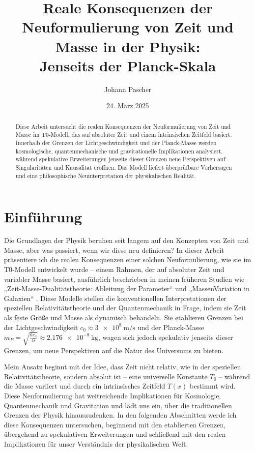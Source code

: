 \documentclass[a4paper,12pt]{article}
\title{Reale Konsequenzen der Neuformulierung von Zeit und Masse in der Physik: \\Jenseits der Planck-Skala}
\author{Johann Pascher}
\date{24. März 2025}
\newcommand{\Tfield}{T(x)}
\begin{document}
	
	\maketitle
	
	\begin{abstract}
		Diese Arbeit untersucht die realen Konsequenzen der Neuformulierung von Zeit und Masse im T0-Modell, das auf absoluter Zeit und einem intrinsischen Zeitfeld basiert. Innerhalb der Grenzen der Lichtgeschwindigkeit und der Planck-Masse werden kosmologische, quantenmechanische und gravitationelle Implikationen analysiert, während spekulative Erweiterungen jenseits dieser Grenzen neue Perspektiven auf Singularitäten und Kausalität eröffnen. Das Modell liefert überprüfbare Vorhersagen und eine philosophische Neuinterpretation der physikalischen Realität.
	\end{abstract}
	
	\tableofcontents
	\newpage
	
	\section{Einführung}
	
	Die Grundlagen der Physik beruhen seit langem auf den Konzepten von Zeit und Masse, aber was passiert, wenn wir diese neu definieren? In dieser Arbeit präsentiere ich die realen Konsequenzen einer solchen Neuformulierung, wie sie im T0-Modell entwickelt wurde – einem Rahmen, der auf absoluter Zeit und variabler Masse basiert, ausführlich beschrieben in meinen früheren Studien wie „Zeit-Masse-Dualitätstheorie: Ableitung der Parameter“ \cite{pascher_params_2025} und „MassenVariation in Galaxien“ \cite{pascher_galaxies_2025}. Diese Modelle stellen die konventionellen Interpretationen der speziellen Relativitätstheorie und der Quantenmechanik in Frage, indem sie Zeit als feste Größe und Masse als dynamisch behandeln. Sie etablieren Grenzen bei der Lichtgeschwindigkeit \(c_0 \approx \SI{3e8}{\meter\per\second}\) und der Planck-Masse \(m_P = \sqrt{\frac{\hbar c_0}{G}} \approx \SI{2.176e-8}{\kilo\gram}\), wagen sich jedoch spekulativ jenseits dieser Grenzen, um neue Perspektiven auf die Natur des Universums zu bieten.
	
	Mein Ansatz beginnt mit der Idee, dass Zeit nicht relativ, wie in der speziellen Relativitätstheorie, sondern absolut ist – eine universelle Konstante \(T_0\) – während die Masse variiert und durch ein intrinsisches Zeitfeld \(\Tfield\) bestimmt wird. Diese Neuformulierung hat weitreichende Implikationen für Kosmologie, Quantenmechanik und Gravitation und lädt uns ein, über die traditionellen Grenzen der Physik hinauszudenken. In den folgenden Abschnitten werde ich diese Konsequenzen untersuchen, beginnend mit den etablierten Grenzen, übergehend zu spekulativen Erweiterungen und schließend mit den realen Implikationen für unser Verständnis der physikalischen Welt.
	
\end{document}

